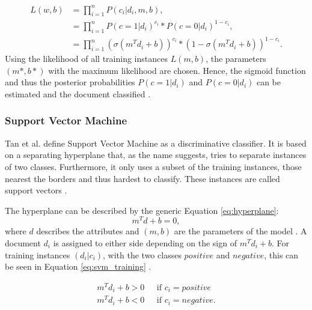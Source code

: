         \begin{equation}
        \begin{split}
            \label{eq:logistic_max}
                L(w,b) & = \prod_{i=1}^{n}P(c_i|d_i,m,b), \\
                        & = \prod_{i=1}^{n}P(c=1|d_i)^{c_i} * P(c=0|d_i)^{1-c_i}, \\
                    &    = \prod_{i=1}^{n}(\sigma(m^T d_i + b))^{c_i} * (1 - \sigma(m^T d_i + b))^{1-c_i}.
                        \end{split}
        \end{equation}
Using the likelihood of all training instances $L(m,b)$, the parameters $(m*,b*)$ with the maximum likelihood are chosen. Hence, the sigmoid function and thus the posterior probabilities $P(c=1|d_i)$ and $P(c=0|d_i)$ can be estimated and the document classified \cite{DBLP:books/aw/TanSKK2019}.


\subsubsection{Support Vector Machine}
Tan et al. define Support Vector Machine as a discriminative classifier. It is based on a separating hyperplane that, as the name suggests, tries to separate instances of two classes. Furthermore, it only uses a subset of the training instances, those nearest the borders and thus hardest to classify. These instances are called support vectors \cite{DBLP:books/aw/TanSKK2019}.

The hyperplane can be described by the generic Equation \eqref{eq:hyperplane}:
    \begin{equation}
            \label{eq:hyperplane}
                m^Td + b = 0,
        \end{equation}
    where $d$ describes the attributes and $(m, b)$ are the parameters of the model \cite{DBLP:books/aw/TanSKK2019}. A document $d_i$ is assigned to either side depending on the sign of $m^Td_i + b$. For training instances $(d_i|c_i)$, with the two classes $positive$ and $negative$, this can be seen in Equation \eqref{eq:svm_training} \cite{DBLP:books/aw/TanSKK2019}.
    
    \begin{equation}
            \begin{split}
            \label{eq:svm_training}
                m^Td_i + b > 0 & \text{~~if~} c_i = positive \\
                m^Td_i + b < 0 & \text{~~if~} c_i = negative.
            \end{split}
    \end{equation}
    
